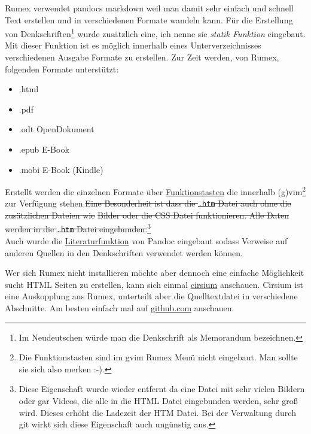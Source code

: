 Rumex verwendet pandocs markdown weil man damit sehr einfach und schnell
Text erstellen und in verschiedenen Formate wandeln kann. Für die
Erstellung von Denkschriften\footnote{Im Neudeutschen würde man die
  Denkschrift als Memorandum bezeichnen.} wurde zusätzlich eine, ich
nenne sie \emph{statik Funktion} eingebaut. Mit dieser Funktion ist es
möglich innerhalb eines Unterverzeichnisses verschiedenen Ausgabe
Formate zu erstellen. Zur Zeit werden, von Rumex, folgenden Formate
unterstützt:

\begin{itemize}
\itemsep1pt\parskip0pt
\item
  .html
\item
  .pdf
\item
  .odt OpenDokument
\item
  .epub E-Book
\item
  .mobi E-Book (Kindle)
\end{itemize}

Erstellt werden die einzelnen Formate über
\hyperref[rumex-kurztasten]{Funktionstasten} die innerhalb
(g)vim\footnote{Die Funktionstasten sind im gvim Rumex Menü nicht
  eingebaut. Man sollte sie sich also merken :-).} zur Verfügung
stehen.\sout{Eine Besonderheit ist dass die \texttt{.htm} Datei auch
ohne die zusätzlichen Dateien wie} \sout{Bilder oder die CSS Datei
funktionieren. Alle Daten werden in die \texttt{.htm} Datei
eingebunden.}\footnote{Diese Eigenschaft wurde wieder entfernt da eine
  Datei mit sehr vielen Bildern oder gar Videos, die alle in die HTML
  Datei eingebunden werden, sehr groß wird. Dieses erhöht die Ladezeit
  der HTM Datei. Bei der Verwaltung durch git wirkt sich diese
  Eigenschaft auch ungünstig aus.}\\Auch wurde die
\hyperref[litfunk]{Literaturfunktion} von Pandoc eingebaut sodass
Verweise auf anderen Quellen in den Denkschriften verwendet werden
können.

Wer sich Rumex nicht installieren möchte aber dennoch eine einfache
Möglichkeit sucht HTML Seiten zu erstellen, kann sich einmal
\href{http://www.it-bayer.de/cirsium}{cirsium} anschauen. Cirsium ist
eine Auskopplung aus Rumex, unterteilt aber die Quelltextdatei in
verschiedene Abschnitte. Am besten einfach mal auf
\href{http://www.github.com/itbayer/cirsium}{github.com} anschauen.


